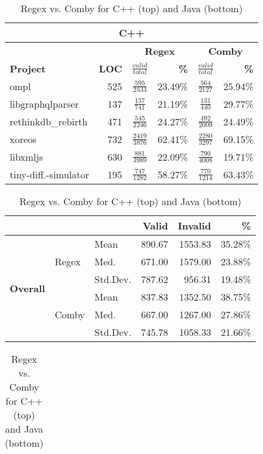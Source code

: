 \documentclass[sigconf,review, anonymous]{acmart}
\newcommand{\mc}[3]{\multicolumn{#1}{#2}{#3}}
\begin{document}
{%
\begin{table}[hbtp]
\centering
\caption{Regex vs. Comby for C++ (top) and Java (bottom)}
\label{tab:table_cpp1java}
\begin{tabularx}{\columnwidth}{X|r|cr|cr}
\toprule
\mc{6}{c}{\textbf{C++}} \\\midrule
                 &              & \multicolumn{2}{c|}{\textbf{Regex}} &\multicolumn{2}{c}{\textbf{Comby}}  \\[1ex]
\textbf{Project} & \textbf{LOC} & $\frac{valid}{total}$ & \textbf{\%} & $\frac{valid}{total}$ &  \textbf{\%} \\[1ex]\midrule
ompl & 525 & $\frac{595}{2533}$ & 23.49\% &  $\frac{564}{2127}$  & 25.94\%   \\[1ex]
libgraphqlparser& 137 & $\frac{157}{741}$ & 21.19\%  & $\frac{131}{440}$ & 29.77\% \\[1ex]
rethinkdb\_rebirth &471 &  $\frac{545}{2246}$ & 24.27\% & $\frac{492}{2009}$ & 24.49\% \\[1ex]
xoreos & 732  & $\frac{2419}{3876}$  & 62.41\% & $\frac{2280}{3297}$ & 69.15\% \\[1ex]
libxmljs &630 &  $\frac{881}{3989}$ & 22.09\% & $\frac{790}{4008}$ & 19.71\% \\[1ex]
tiny-diff.-simulator &  195 & $\frac{747}{1282}$ &58.27\% &$\frac{770}{1214}$ & 63.43\% \\[1ex]
\bottomrule
\end{tabularx}
 \begin{tabularx}{\columnwidth}{Xllrrr}
                  & &       & Valid  & Invalid  & \% \\\midrule
 \multirow{6}{*}{\textbf{Overall}} & \multirow{3}{*}{Regex} & Mean     & 890.67 &  1553.83 & 35.28\% \\
                          & & Med.    & 671.00 & 1579.00  & 23.88\%   \\
                          & & Std.Dev. & 787.62 & 956.31   & 19.48\%  \\\cline{2-6}
  & \multirow{3}{*}{Comby}  & Mean     & 837.83 & 1352.50 & 38.75\%  \\
                         & & Med.    & 667.00 & 1267.00 & 27.86\%  \\
                         & & Std.Dev. & 745.78 & 1058.33& 21.66\%  \\\bottomrule
 \end{tabularx}
\begin{tabularx}{\columnwidth}{X|r|cr|cr}
\toprule

\end{tabularx}
\end{table}}
\end{document}
